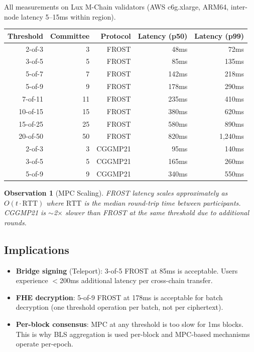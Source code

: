 \documentclass[11pt,a4paper]{article}
\newtheorem{observation}{Observation}[section]
\begin{document}
All measurements on Lux M-Chain validators (AWS c6g.xlarge, ARM64, inter-node latency 5--15ms within region).

\begin{center}
\begin{tabular}{rrrrr}
\toprule
\textbf{Threshold} & \textbf{Committee} & \textbf{Protocol} & \textbf{Latency (p50)} & \textbf{Latency (p99)} \\
\midrule
2-of-3 & 3 & FROST & 48ms & 72ms \\
3-of-5 & 5 & FROST & 85ms & 135ms \\
5-of-7 & 7 & FROST & 142ms & 218ms \\
5-of-9 & 9 & FROST & 178ms & 290ms \\
7-of-11 & 11 & FROST & 235ms & 410ms \\
10-of-15 & 15 & FROST & 380ms & 620ms \\
15-of-25 & 25 & FROST & 580ms & 890ms \\
20-of-50 & 50 & FROST & 820ms & 1,240ms \\
\midrule
2-of-3 & 3 & CGGMP21 & 95ms & 140ms \\
3-of-5 & 5 & CGGMP21 & 165ms & 260ms \\
5-of-9 & 9 & CGGMP21 & 340ms & 550ms \\
\bottomrule
\end{tabular}
\end{center}

\begin{observation}[MPC Scaling]
FROST latency scales approximately as $O(t \cdot \text{RTT})$ where $\text{RTT}$ is the median round-trip time between participants. CGGMP21 is $\sim$2$\times$ slower than FROST at the same threshold due to additional rounds.
\end{observation}

\subsection{Implications}

\begin{itemize}[leftmargin=2em]
\item \textbf{Bridge signing} (Teleport): 3-of-5 FROST at 85ms is acceptable. Users experience $<$200ms additional latency per cross-chain transfer.
\item \textbf{FHE decryption}: 5-of-9 FROST at 178ms is acceptable for batch decryption (one threshold operation per batch, not per ciphertext).
\item \textbf{Per-block consensus}: MPC at any threshold is too slow for 1ms blocks. This is why BLS aggregation is used per-block and MPC-based mechanisms operate per-epoch.
\end{itemize}
\end{document}
